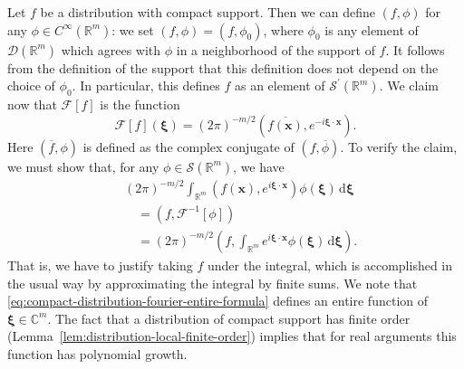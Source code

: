 \begin{Example}
\label{ex:fourier-compact-distribution-entire}
Let $f$ be a distribution with compact support. Then we can define $(f,\phi)$ for any $\phi\in C^\infty(\mathbb{R}^m)$: we set $(f,\phi)=(f,\phi_0)$, where $\phi_0$ is any element of $\mathcal{D}(\mathbb{R}^m)$ which agrees with $\phi$ in a neighborhood of the support of $f$. It follows from the definition of the support that this definition does not depend on the choice of $\phi_0$. In particular, this defines $f$ as an element of $\mathcal{S}^{\prime}(\mathbb{R}^m)$. We claim now that $\mathcal{F}[f]$ is the function
\begin{equation}\label{eq:compact-distribution-fourier-entire-formula}
\mathcal{F}[f](\bm{\xi})=(2\pi)^{-m/2}(\overline{f(\bm{x})},e^{-i\bm{\xi}\cdot\bm{x}}).
\end{equation}
Here $(\overline f,\phi)$ is defined as the complex conjugate of $(f,\overline\phi)$. To verify the claim, we must show that, for any $\phi\in\mathcal{S}(\mathbb{R}^m)$, we have
\begin{equation}\label{eq:compact-distribution-fourier-integral-interchange}
\begin{aligned}
&(2\pi)^{-m/2}\int_{\mathbb{R}^m}(f(\bm{x}),e^{i\bm{\xi}\cdot\bm{x}})\phi(\bm{\xi})\,\mathrm{d}\bm{\xi}\\
&\quad=(f,\mathcal{F}^{-1}[\phi])\\
&\quad=(2\pi)^{-m/2}\left(f,\int_{\mathbb{R}^m}e^{i\bm{\xi}\cdot\bm{x}}\phi(\bm{\xi})\,\mathrm{d}\bm{\xi}\right).
\end{aligned}
\end{equation}
That is, we have to justify taking $f$ under the integral, which is accomplished in the usual way by approximating the integral by finite sums. We note that \eqref{eq:compact-distribution-fourier-entire-formula} defines an entire function of $\bm{\xi}\in\mathbb{C}^m$. The fact that a distribution of compact support has finite order (Lemma~\ref{lem:distribution-local-finite-order}) implies that for real arguments this function has polynomial growth.
\end{Example}
